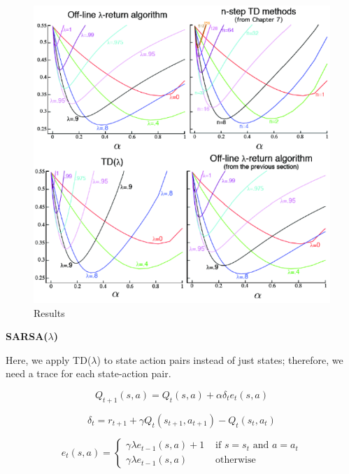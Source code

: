 \documentclass{article}
\begin{document}
\begin{figure}[h]
\includegraphics[scale=0.45]{results}
\centering
\caption{Results}
\end{figure}

\noindent
\textbf{SARSA($\lambda$)}

\noindent
Here, we apply TD($\lambda$) to state action pairs instead of just states;
therefore, we need a trace for each state-action pair.

\begin{equation}
Q_{t+1}(s, a)=Q_{t}(s, a)+\alpha \delta_{t} e_{t}(s, a)
\end{equation}

\begin{equation}
\delta_{t}=r_{t+1}+\gamma Q_{t}\left(s_{t+1}, a_{t+1}\right)-Q_{t}\left(s_{t}, a_{t}\right)
\end{equation}

\begin{equation}
e_{t}(s, a)=\left\{\begin{array}{ll}
\gamma \lambda e_{t-1}(s, a)+1 & \text { if } s=s_{t} \text { and } a=a_{t} \\
\gamma \lambda e_{t-1}(s, a) & \text { otherwise }
\end{array}\right.
\end{equation}
\end{document}
